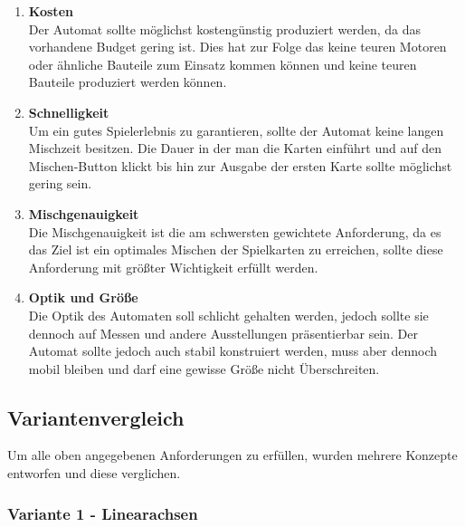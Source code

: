 \begin{enumerate}
    \item \textbf{Kosten}  \\
    Der Automat sollte möglichst kostengünstig produziert werden,
    da das vorhandene Budget gering ist. Dies hat zur Folge das keine teuren Motoren
    oder ähnliche Bauteile zum Einsatz kommen können und keine teuren Bauteile produziert
    werden können.
    \item \textbf{Schnelligkeit} \\
    Um ein gutes Spielerlebnis zu garantieren, sollte der Automat keine
    langen Mischzeit besitzen. Die Dauer in der man die Karten einführt und auf den
    Mischen-Button klickt bis hin zur Ausgabe der ersten Karte sollte möglichst gering sein.
    \item \textbf{Mischgenauigkeit} \\
    Die Mischgenauigkeit ist die am schwersten gewichtete Anforderung,
    da es das Ziel ist ein optimales Mischen der Spielkarten zu erreichen, sollte
    diese Anforderung mit größter Wichtigkeit erfüllt werden.
    \item \textbf{Optik und Größe} \\
    Die Optik des Automaten soll schlicht gehalten werden, jedoch sollte
    sie dennoch auf Messen und andere Ausstellungen präsentierbar sein. Der Automat
    sollte jedoch auch stabil konstruiert werden, muss aber dennoch mobil bleiben und
    darf eine gewisse Größe nicht Überschreiten.
\end{enumerate}

\subsection{Variantenvergleich}
Um alle oben angegebenen Anforderungen zu erfüllen, wurden mehrere Konzepte entworfen und diese verglichen.

\subsubsection{Variante 1 - Linearachsen}


